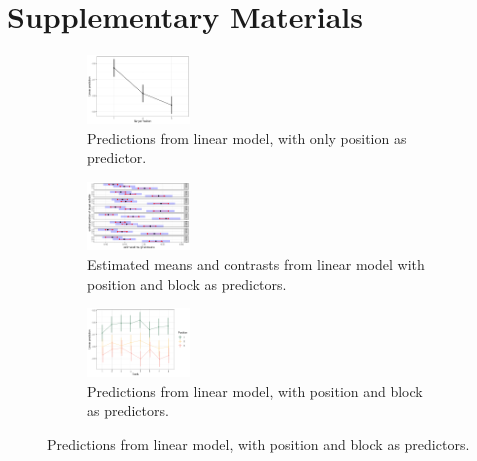 \documentclass[11pt]{article}
\begin{document}
\section{Supplementary Materials}


\begin{figure}
	\begin{subfigure}{0.2\textwidth}
		\includegraphics[width=0.3\textwidth]{exp3figS1.pdf}
		\caption{Predictions from linear model, with only position as predictor.}
	\end{subfigure} 
	\begin{subfigure}{\textwidth}
		\includegraphics[width=0.3\textwidth]{exp3figS2a.pdf}
		\caption{Estimated means and contrasts from linear model with position and block as predictors.}
	\end{subfigure}
	\begin{subfigure}{\textwidth}
	\includegraphics[width=0.3\textwidth]{exp3figS2b.pdf}
	\caption{Predictions from linear model, with position and block as predictors.}
	\end{subfigure}
	\label{fig:Fig. S1}
\end{figure}
\end{document}
